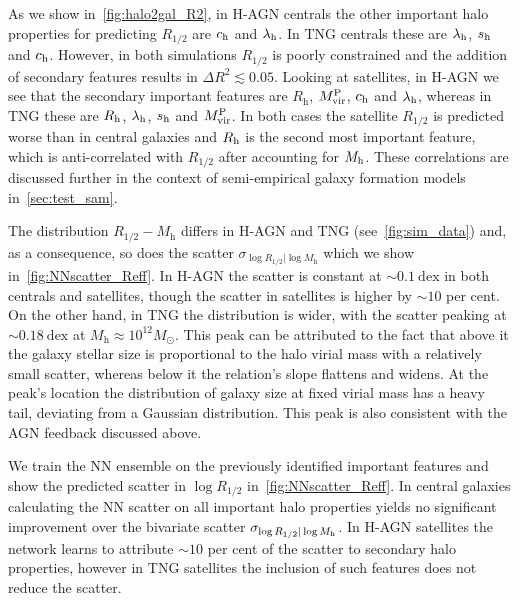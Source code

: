 \documentclass[useAMS,usenatbib]{mnras}
\begin{document}
As we show in~\cref{fig:halo2gal_R2}, in H-AGN centrals the other important halo properties for predicting $R_{1/2}$ are $c_{\rm h}$ and $\lambda_{\rm h}$. In TNG centrals these are $\lambda_{\rm h}$, $s_{\rm h}$ and $c_{\rm h}$. However, in both simulations $R_{1/2}$ is poorly constrained and the addition of secondary features results in $\Delta R^2 \lesssim 0.05$. Looking at satellites, in H-AGN we see that the secondary important features are $R_{\mathrm h}$, $M_{\rm vir}^{\rm P}$, $c_{\rm h}$ and $\lambda_{\rm h}$, whereas in TNG these are $R_{\rm h}$, $\lambda_{\rm h}$, $s_{\rm h}$ and $M_{\rm vir}^{\rm P}$. In both cases the satellite $R_{1/2}$ is predicted worse than in central galaxies and $R_{\rm h}$ is the second most important feature, which is anti-correlated with $R_{1/2}$ after accounting for $M_{\rm h}$. These correlations are discussed further in the context of semi-empirical galaxy formation models in~\cref{sec:test_sam}.

The distribution $R_{1/2} - M_\mathrm{h}$ differs in H-AGN and TNG (see~\cref{fig:sim_data}) and, as a consequence, so does the scatter $\sigma_{\log R_{1/2} | \log M_\mathrm{h}}$ which we show in~\cref{fig:NNscatter_Reff}. In H-AGN the scatter is constant at $\sim 0.1~\mathrm{dex}$ in both centrals and satellites, though the scatter in satellites is higher by $\sim 10$ per cent. On the other hand, in TNG the distribution is wider, with the scatter peaking at $\sim 0.18~\mathrm{dex}$ at $M_\mathrm{h}\approx 10^{12} M_\odot$. This peak can be attributed to the fact that above it the galaxy stellar size is proportional to the halo virial mass with a relatively small scatter, whereas below it the relation's slope flattens and widens. At the peak's location the distribution of galaxy size at fixed virial mass has a heavy tail, deviating from a Gaussian distribution. This peak is also consistent with the AGN feedback discussed above.

We train the NN ensemble on the previously identified important features and show the predicted scatter in $\log R_{1/2}$ in~\cref{fig:NNscatter_Reff}. In central galaxies calculating the NN scatter on all important halo properties yields no significant improvement over the bivariate scatter $\sigma_{\log R_{1/2} | \log M_{\rm h}}$. In H-AGN satellites the network learns to attribute $\sim10$ per cent of the scatter to secondary halo properties, however in TNG satellites the inclusion of such features does not reduce the scatter.
\end{document}
